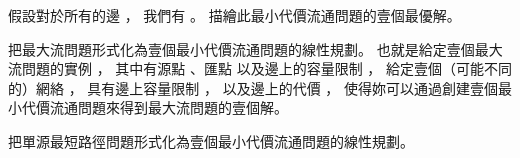 \startANSWER
{}
\stopANSWER

\startigBase[continue]\startitem
假設對於所有的邊 ，
我們有 。
描繪此最小代價流通問題的壹個最優解。
\stopitem\stopigBase

\startANSWER
{}
\stopANSWER

\startigBase[continue]\startitem
把最大流問題形式化為壹個最小代價流通問題的線性規劃。
也就是給定壹個最大流問題的實例 ，
其中有源點 、匯點  以及邊上的容量限制 ，
給定壹個（可能不同的）網絡 ，
具有邊上容量限制 ，
以及邊上的代價 ，
使得妳可以通過創建壹個最小代價流通問題來得到最大流問題的壹個解。
\stopitem\stopigBase

\startANSWER
{}
\stopANSWER

\startigBase[continue]\startitem
把單源最短路徑問題形式化為壹個最小代價流通問題的線性規劃。
\stopitem\stopigBase

\startANSWER
{}
\stopANSWER
\stopPROBLEM

\stopsubject%
